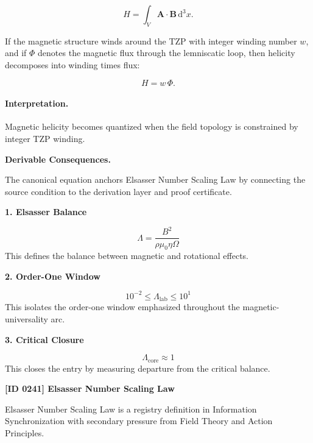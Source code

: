 \begin{equation}
H
=
\int_V
\mathbf{A}\cdot\mathbf{B}
\,\mathrm{d}^3x .
\end{equation}

If the magnetic structure winds around the TZP with integer winding number $w$, and if $\Phi$ denotes the magnetic flux through the lemniscatic loop, then helicity decomposes into winding times flux:

\begin{equation}
\boxed{
H=w\,\Phi .
}
\end{equation}

\paragraph{Interpretation.}
Magnetic helicity becomes quantized when the field topology is constrained by integer TZP winding.

\par\vspace{0.35em}
\noindent\textbf{Derivable Consequences.}\quad
\begingroup
\footnotesize
\raggedright
The canonical equation anchors Elsasser Number Scaling Law by connecting the source condition to the derivation layer and proof certificate.
\par\endgroup

\noindent\textbf{1. Elsasser Balance}\par
\[
\Lambda=\frac{B^2}{\rho\mu_0\eta\Omega}
\]
\noindent This defines the balance between magnetic and rotational effects.\par
\noindent\textbf{2. Order-One Window}\par
\[
10^{-2}\leq\Lambda_{\mathrm{lab}}\leq 10^{1}
\]
\noindent This isolates the order-one window emphasized throughout the magnetic-universality arc.\par
\noindent\textbf{3. Critical Closure}\par
\[
\Lambda_{\mathrm{core}}\approx 1
\]
\noindent This closes the entry by measuring departure from the critical balance.\par

\clearpage
\noindent\textbf{[ID 0241] Elsasser Number Scaling Law}\par
\vspace{0.35em}
\begingroup\small
{}
Elsasser Number Scaling Law is a registry definition in Information Synchronization with secondary pressure from Field Theory and Action Principles.

